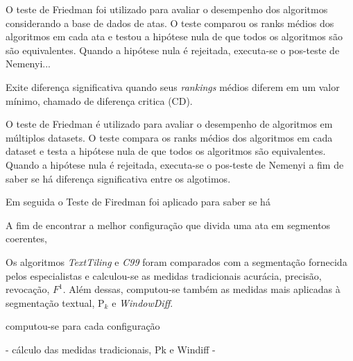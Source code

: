
%
O teste de Friedman foi utilizado para avaliar o desempenho dos algoritmos considerando a base de dados de atas. 
%
O teste comparou os ranks médios dos algoritmos em cada ata e testou a hipótese nula de que todos os algoritmos são são equivalentes. 
%
Quando a hipótese nula é rejeitada, executa-se o pos-teste de Nemenyi...

Exite diferença significativa quando seus \textit{rankings} médios diferem em um valor mínimo, chamado de diferença critica (CD). 

O teste de Friedman é utilizado para avaliar o desempenho de algoritmos em múltiplos datasets. O teste compara os ranks médios dos algoritmos em cada dataset e testa a hipótese nula de que todos os algoritmos são equivalentes. Quando a hipótese nula é rejeitada, executa-se o pos-teste de Nemenyi a fim de saber se há diferença significativa entre os algotimos.


Em seguida o Teste de Firedman foi aplicado para saber se há









A fim de encontrar a melhor configuração que divida uma ata em segmentos coerentes, 

Os algoritmos \textit{TextTiling} e \textit{C99} foram comparados com a segmentação fornecida pelos especialistas e calculou-se as medidas tradicionais acurácia, precisão, revocação, $F^1$. Além dessas, computou-se também as medidas mais aplicadas à segmentação textual, P$_k$ e \textit{WindowDiff}.


computou-se para cada configuração 


- cálculo das medidas tradicionais, Pk e Windiff
- 









